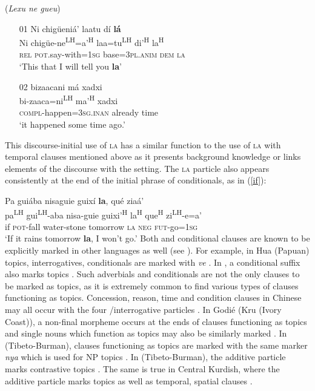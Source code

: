 \ea\label{initial2} (\textit{Lexu ne gueu})
\begin{itemize}
\item[01]
\glll Ni chig\"{u}eni\'{a}' laatu d\'{i} \textbf{l\'{a}}  \\
Ni chig\"{u}e-ne\textsuperscript{LH}=a'\textsuperscript{H} laa=tu\textsuperscript{LH} di'\textsuperscript{H}  la\textsuperscript{H}  \\
\textsc{rel} \textsc{pot}.say-with=1\textsc{sg} base=3\textsc{pl.anim} \textsc{dem} \textsc{la}  \\
\glt  `This that I will tell you \textbf{la}'


\item[02]
\glll bizaacani m\'{a} xadxi  \\
bi-zaaca=ni\textsuperscript{LH} ma'\textsuperscript{H} xadxi  \\
\textsc{compl}-happen=3\textsc{sg.inan} already time  \\
\glt  `it happened some time ago.'

\end{itemize}
\z
This discourse-initial use of \textsc{la} has a similar function to the use of \textsc{la} with temporal clauses mentioned above as it presents background knowledge or links elements of the discourse with the setting. The \textsc{la} particle also appears consistently at the end of the initial phrase of conditionals, as in (\ref{if}):

\ea\label{if}
\glll Pa gui\'{a}ba nisaguie guix\'{i} \textbf{la}, qu\'{e} zia\'{a}'  \\
pa\textsuperscript{LH} gui\textsuperscript{LH}-aba nisa-guie guixi'\textsuperscript{H}  la\textsuperscript{H} que\textsuperscript{H} zi\textsuperscript{LH}-e=a'  \\
if \textsc{pot}-fall water-stone tomorrow \textsc{la} \textsc{neg} \textsc{fut}-go=1\textsc{sg}  \\
\glt `If it rains tomorrow \textbf{la}, I won't go.' \hfill \citep[109]{pickett1998}
\z
Both  and conditional clauses are known to be explicitly marked in other languages as well (see \citealt[292]{thompson2007}). For example, in Hua (Papuan) topics, interrogatives, conditionals are marked with \textit{ve} \citep{haiman1978}. In , a conditional suffix also marks topics \citep{kerslake1996}. Such adverbials and conditionals are not the only clauses to be marked as topics, as it is extremely common to find various types of  clauses functioning as topics. Concession, reason, time and condition clauses in Chinese may all occur with the four /interrogative particles \citep[293]{thompson2007}. In Godi\'{e} (Kru (Ivory Coast)), a non-final morpheme occurs at the ends of  clauses functioning as topics and single nouns which function as topics may also be similarly marked \citep{marchese1977,marchese1987}. In  (Tibeto-Burman),  clauses functioning as topics are marked with the same marker \textit{nya} which is used for NP topics \citep[294]{thompson2007}. In  (Tibeto-Burman), the additive particle marks contrastive topics \citep{konnerth2013}. The same is true in Central Kurdish, where the additive particle marks topics as well as temporal, spatial clauses \citep{opengin2013}.

